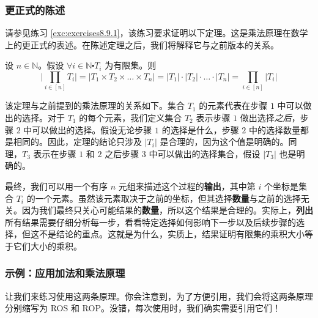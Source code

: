 \subsubsection*{更正式的陈述}

请参见练习 \ref{exc:exercises8.9.1}，该练习要求证明以下定理。这是乘法原理在数学上的更正式的表述。在陈述定理之后，我们将解释它与之前版本的关系。

\begin{theorem}
    设 $n \in \mathbb{N}$。假设 $\forall i \in \mathbb{N} \centerdot T_i$ 为有限集。则
    \[\Bigg|\prod_{i \in [n]} T_i \Bigg| = |T_1 \times T_2 \times \dots \times T_n| = |T_1| \cdot |T_2| \cdot \dots \cdot |T_n| = \prod_{i \in [n]} |T_i|\]
\end{theorem}

该定理与之前提到的乘法原理的关系如下。集合 $T_1$ 的元素代表在步骤 $1$ 中可以做出的选择。对于 $T_1$ 的每个元素，我们定义集合 $T_2$ 表示步骤 $1$ 做出选择\emph{之后}，步骤 $2$ 中可以做出的选择。假设无论步骤 $1$ 的选择是什么，步骤 $2$ 中的选择数量都是相同的。因此，定理的结论只涉及 $|T_i|$ 是合理的，因为这个值是明确的。同理，$T_3$ 表示在步骤 $1$ 和 $2$ 之后步骤 $3$ 中可以做出的选择集合，假设 $|T_3|$ 也是明确的。

最终，我们可以用一个有序 $n$ 元组来描述这个过程的\textbf{输出}，其中第 $i$ 个坐标是集合 $T_i$ 的一个元素。虽然该元素取决于之前的坐标，但其选择\textbf{数量}与之前的选择无关。因为我们最终只关心可能结果的\textbf{数量}，所以这个结果是合理的。实际上，\textbf{列出}所有结果需要仔细分析每一步，看看特定选择如何影响下一步以及后续步骤的选择，但这不是结论的重点。这就是为什么，实质上，结果证明有限集的乘积大小等于它们大小的乘积。

\subsubsection*{示例：应用加法和乘法原理}

让我们来练习使用这两条原理。你会注意到，为了方便引用，我们会将这两条原理分别缩写为 ROS 和 ROP。没错，每次使用时，我们确实需要引用它们！\\

